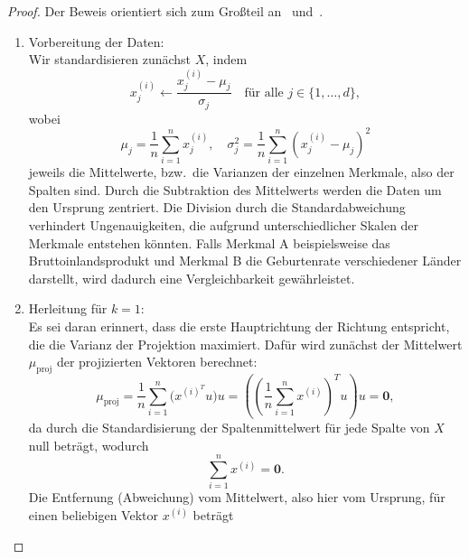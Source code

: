 \begin{proof}
    Der Beweis orientiert sich zum Großteil an~\cite[S.~166-169]{ngMachineLearningCS2292023} und~\cite[S.~32 f.]{hsuMachineLearningTheory2016}.
    \begin{enumerate}[wide,label=\underline{Schritt \arabic*}.]
        \item\label{itm:pca1} Vorbereitung der Daten:\\    
        Wir standardisieren zunächst \(X\), indem 
        \begin{equation*}
            x_{j}^{(i)} \leftarrow \frac{x_{j}^{(i)}-\mu_j}{\sigma_j} \quad \text{für alle } j \in \{1,\ldots,d\},
        \end{equation*}  
        wobei 
        \begin{equation*}
            \mu_j = \frac{1}{n}\sum_{i=1}^{n}x_{j}^{(i)}, \quad \sigma_{j}^{2} = \frac{1}{n}\sum_{i=1}^{n}{(x_{j}^{(i)} - \mu_{j})}^{2}
        \end{equation*}
        jeweils die Mittelwerte, bzw.\ die Varianzen der einzelnen Merkmale, also der Spalten sind.
        Durch die Subtraktion des Mittelwerts werden die Daten um den Ursprung zentriert.
        Die Division durch die Standardabweichung verhindert Ungenauigkeiten, die aufgrund unterschiedlicher Skalen der Merkmale entstehen könnten.
        Falls Merkmal A beispielsweise das Bruttoinlandsprodukt und Merkmal B die Geburtenrate verschiedener Länder darstellt, wird dadurch eine Vergleichbarkeit gewährleistet.
        \item\label{itm:pca2} Herleitung für \(k=1\):\\
        Es sei daran erinnert, dass die erste Hauptrichtung der Richtung entspricht, die die Varianz der Projektion maximiert.
        Dafür wird zunächst der Mittelwert \(\mu_{\operatorname{proj}}\) der projizierten Vektoren berechnet:
        \begin{equation*}
            \mu_{\operatorname{proj}} = \frac{1}{n}\sum_{i=1}^{n}\big(x^{{(i)}^{T}}u\big)u = \left({\left(\frac{1}{n}\sum_{i=1}^{n}x^{(i)}\right)}^{T}u\right)u = \symbf{0},
        \end{equation*}
        da durch die Standardisierung der Spaltenmittelwert für jede Spalte von \(X\) null beträgt, wodurch
        \begin{equation*}
            \sum_{i=1}^{n}x^{(i)} = \symbf{0}.
        \end{equation*}
        Die Entfernung (Abweichung) vom Mittelwert, also hier vom Ursprung, für einen beliebigen Vektor \(x^{(i)}\) beträgt

\end{enumerate}
\end{proof}
